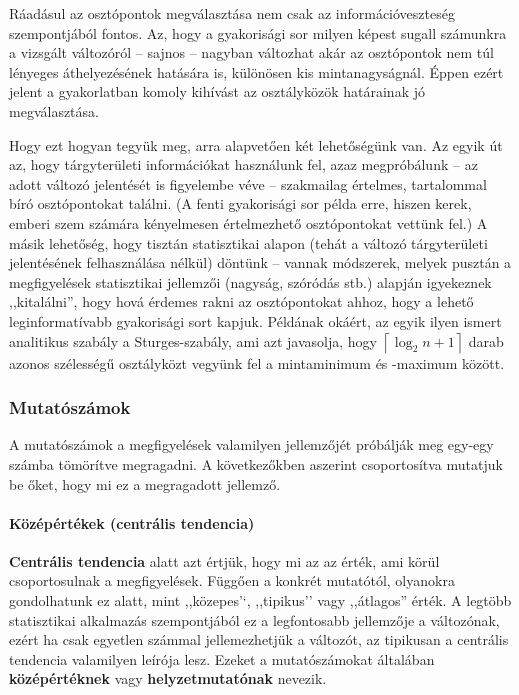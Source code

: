 \documentclass[
]{book}
\begin{document}
Ráadásul az osztópontok megválasztása nem csak az információveszteség szempontjából fontos. Az, hogy a gyakorisági sor milyen képest sugall számunkra a vizsgált változóról -- sajnos -- nagyban változhat akár az osztópontok nem túl lényeges áthelyezésének hatására is, különösen kis mintanagyságnál. Éppen ezért jelent a gyakorlatban komoly kihívást az osztályközök határainak jó megválasztása.

Hogy ezt hogyan tegyük meg, arra alapvetően két lehetőségünk van. Az egyik út az, hogy tárgyterületi információkat használunk fel, azaz megpróbálunk -- az adott változó jelentését is figyelembe véve -- szakmailag értelmes, tartalommal bíró osztópontokat találni. (A fenti gyakorisági sor példa erre, hiszen kerek, emberi szem számára kényelmesen értelmezhető osztópontokat vettünk fel.) A másik lehetőség, hogy tisztán statisztikai alapon (tehát a változó tárgyterületi jelentésének felhasználása nélkül) döntünk -- vannak módszerek, melyek pusztán a megfigyelések statisztikai jellemzői (nagyság, szóródás stb.) alapján igyekeznek ,,kitalálni'', hogy hová érdemes rakni az osztópontokat ahhoz, hogy a lehető leginformatívabb gyakorisági sort kapjuk. Példának okáért, az egyik ilyen ismert analitikus szabály a Sturges-szabály, ami azt javasolja, hogy \(\left\lceil \log_2 n+1\right\rceil\) darab azonos szélességű osztályközt vegyünk fel a mintaminimum és -maximum között.

\hypertarget{deskriptivmennyegyvaltanalitikusmutatoszamok}{%
\subsubsection{Mutatószámok}\label{deskriptivmennyegyvaltanalitikusmutatoszamok}}

A mutatószámok a megfigyelések valamilyen jellemzőjét próbálják meg egy-egy számba tömörítve megragadni. A következőkben aszerint csoportosítva mutatjuk be őket, hogy mi ez a megragadott jellemző.

\hypertarget{deskriptivmennyegyvaltanalitikusmutatoszamokcentralistendencia}{%
\paragraph{Középértékek (centrális tendencia)}\label{deskriptivmennyegyvaltanalitikusmutatoszamokcentralistendencia}}

\textbf{Centrális tendencia} alatt azt értjük, hogy mi az az érték, ami körül csoportosulnak a megfigyelések. Függően a konkrét mutatótól, olyanokra gondolhatunk ez alatt, mint ,,közepes'`, ,,tipikus'' vagy ,,átlagos'' érték. A legtöbb statisztikai alkalmazás szempontjából ez a legfontosabb jellemzője a változónak, ezért ha csak egyetlen számmal jellemezhetjük a változót, az tipikusan a centrális tendencia valamilyen leírója lesz. Ezeket a mutatószámokat általában \textbf{középértéknek} vagy \textbf{helyzetmutatónak} nevezik.
\end{document}
